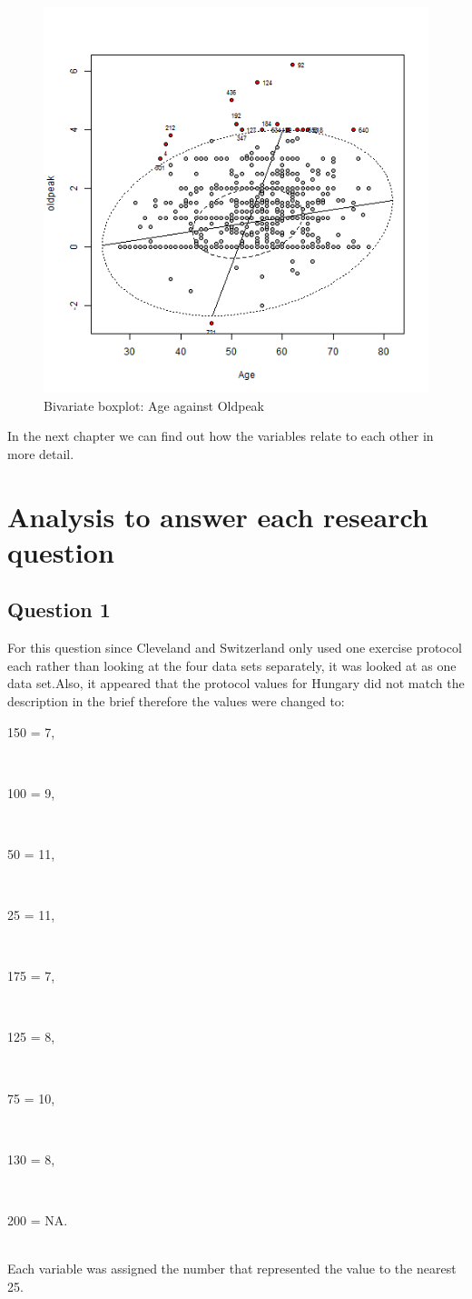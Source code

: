 \documentclass[a4paper]{article}
\begin{document}
\begin{figure}[H]
	\begin{center}
		\includegraphics[width=12cm]{intro files/intplot5.png}
	\end{center}
	\caption{Bivariate boxplot: Age against Oldpeak}
\end{figure}


In the next chapter we can find out how the variables relate to each other in more detail.

\section{Analysis to answer each research question}

\subsection{Question 1}
For this question since Cleveland and Switzerland only used one exercise protocol each rather than looking at the four data sets separately, it was looked at as one data set.Also, it appeared that the protocol values for Hungary did not match the description in the brief therefore the values were changed to:\\
\centerline{150 = 7,}\\
\centerline{100 = 9,}\\
\centerline{50 = 11,}\\
\centerline{25 = 11,}\\
\centerline{175 = 7,}\\
\centerline{125 = 8,}\\
\centerline{75 = 10,}\\
\centerline{130 = 8,}\\
\centerline{200 = NA.}\\
Each variable was assigned the number that represented the value to the nearest 25.
\end{document}
